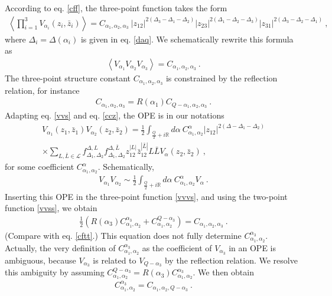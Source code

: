 \documentclass[12pt, a4paper, notitlepage, twoside]{report}
\numberwithin{equation}{section}
\theoremstyle{break}
\begin{document}
According to eq. \eqref{cff}, the three-point function takes the form
\begin{align}
\left\langle \prod_{i=1}^3 V_{\alpha_i}(z_i,\bar{z}_i)\right\rangle = C_{\alpha_1,\alpha_2,\alpha_3}\ |z_{12}|^{2(\Delta_3-\Delta_1-\Delta_2)} |z_{23}|^{2(\Delta_1-\Delta_2-\Delta_3)} |z_{31}|^{2(\Delta_3-\Delta_2-\Delta_1)}\ ,
\label{vvv}
\end{align}
where $\Delta_i = \Delta(\alpha_i)$ is given in eq. \eqref{daq}.
We schematically rewrite this formula as 
\begin{align}
 \boxed{ \left\langle V_{\alpha_1}V_{\alpha_2}V_{\alpha_3} \right\rangle = C_{\alpha_1,\alpha_2,\alpha_3} }\ .
\label{vvvs}
\end{align}
The three-point structure constant $C_{\alpha_1,\alpha_2,\alpha_3}$ is constrained by the reflection relation, for instance
\begin{align}
 C_{\alpha_1,\alpha_2,\alpha_3} = R(\alpha_1) C_{Q-\alpha_1,\alpha_2,\alpha_3}\ .
\label{crc}
\end{align}
Adapting eq. \eqref{vvs} and eq. \eqref{ccz}, the OPE is in our notations
\begin{multline}
 V_{\alpha_1}(z_1,\bar{z}_1) V_{\alpha_2}(z_2,\bar{z}_2) = \frac12 \int_{\frac{Q}{2}+i{\mathbb{R}}} d\alpha\ C_{\alpha_1,\alpha_2}^\alpha |z_{12}|^{2(\Delta-\Delta_1-\Delta_2)} 
\\ \times 
\sum_{L,\bar{L}\in \mathcal{L}} f_{\Delta_1,\Delta_2}^{\Delta,L} f_{\Delta_1,\Delta_2}^{\Delta,\bar{L}}z_{12}^{|L|} \bar{z}_{12}^{|\bar{L}|} L\bar{L} V_{\alpha}(z_2,\bar{z}_2) \ , 
\label{vvh}
\end{multline}
for some coefficient $C_{\alpha_1,\alpha_2}^\alpha$.
Schematically,
\begin{align}
 \boxed{V_{\alpha_1}V_{\alpha_2} \sim \frac12\int_{\frac{Q}{2}+i{\mathbb{R}}} d\alpha\ C_{\alpha_1,\alpha_2}^{\alpha} V_\alpha}\ .
\label{vvi}
\end{align}
Inserting this OPE in the three-point function \eqref{vvvs}, and using the two-point function \eqref{vvss}, we obtain
\begin{align}
 \frac12\left(R(\alpha_3)C_{\alpha_1,\alpha_2}^{\alpha_3} + C_{\alpha_1,\alpha_2}^{Q-\alpha_3}\right) = C_{\alpha_1,\alpha_2,\alpha_3}
\ . 
\label{hcc}
\end{align}
(Compare with eq. \eqref{cftt}.) 
This equation does not fully determine $C_{\alpha_1,\alpha_2}^{\alpha_3}$.
Actually, the very definition of $C_{\alpha_1,\alpha_2}^{\alpha_3}$ as the coefficient of $V_{\alpha_3}$ in an OPE is ambiguous, because $V_{\alpha_3}$ is related to $V_{Q-\alpha_3}$ by the reflection relation.
We  resolve this ambiguity by assuming $C_{\alpha_1,\alpha_2}^{Q-\alpha_3}=R(\alpha_3)C_{\alpha_1,\alpha_2}^{\alpha_3}$.
We then obtain
\begin{align}
 \boxed{C_{\alpha_1,\alpha_2}^{\alpha_3} = C_{\alpha_1,\alpha_2,Q-\alpha_3}}\ .
\label{cec}
\end{align}
\end{document}

